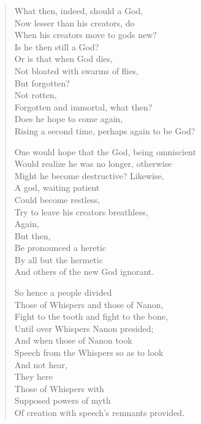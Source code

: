 \begin{paracol}{2}
\begin{leftcolumn}
\begin{verse}
What then, indeed, should a God,\\
\vin Now lesser than his creators, do\\
\vin When his creators move to gods new?\\
Is he then still a God?\\
\vin Or is that when God dies,\\
\vin Not bloated with swarms of flies,\\
\vin \vin But forgotten?\\
\vin \vin Not rotten,\\
\vin Forgotten and immortal, what then?\\
\vin Does he hope to come again,\\
Rising a second time, perhaps again to be God?

One would hope that the God, being omniscient\\
\vin Would realize he was no longer, otherwise\\
\vin Might he become destructive? Likewise,\\
A god, waiting patient\\
\vin Could become restless,\\
\vin Try to leave his creators breathless,\\
\vin \vin Again,\\
\vin \vin But then,\\
\vin Be pronounced a heretic\\
\vin By all but the hermetic\\
And others of the new God ignorant.

So hence a people divided\\
\vin Those of Whispers and those of Nanon,\\
\vin Fight to the tooth and fight to the bone,\\
Until over Whispers Nanon presided;\\
\vin And when those of Nanon took\\
\vin Speech from the Whispers so as to look\\
\vin \vin And not hear,\\
\vin \vin They here\\
\vin Those of Whispers with\\
\vin Supposed powers of myth\\
Of creation with speech's remnants provided.


\end{verse}
\end{leftcolumn}
\end{paracol}
